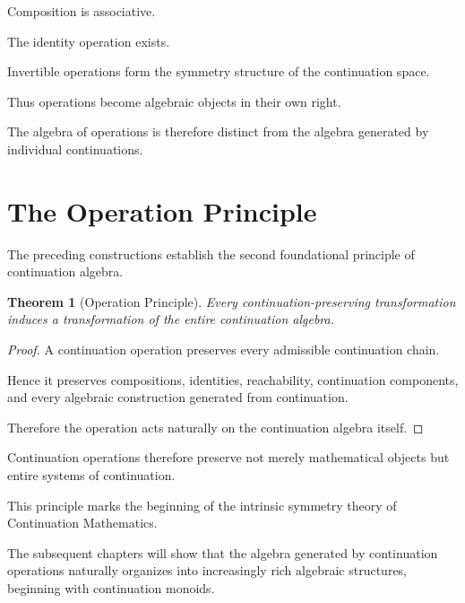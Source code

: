 \documentclass[13pt,openany]{book}
\theoremstyle{plain}
\newtheorem{theorem}{Theorem}[chapter]
\theoremstyle{definition}
\begin{document}
Composition is associative.

The identity operation exists.

Invertible operations form the symmetry structure of the continuation space.

Thus operations become algebraic objects in their own right.

The algebra of operations is therefore distinct from the algebra generated by
individual continuations.

\section{The Operation Principle}

The preceding constructions establish the second foundational principle of
continuation algebra.

\begin{theorem}[Operation Principle]

Every continuation-preserving transformation induces a transformation of the
entire continuation algebra.

\end{theorem}

\begin{proof}

A continuation operation preserves every admissible continuation chain.

Hence it preserves compositions, identities, reachability, continuation
components, and every algebraic construction generated from continuation.

Therefore the operation acts naturally on the continuation algebra itself.

\end{proof}

Continuation operations therefore preserve not merely mathematical objects but
entire systems of continuation.

This principle marks the beginning of the intrinsic symmetry theory of
Continuation Mathematics.

The subsequent chapters will show that the algebra generated by continuation
operations naturally organizes into increasingly rich algebraic structures,
beginning with continuation monoids.

\end{document}
